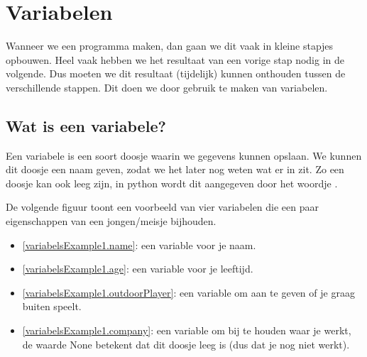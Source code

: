 \section{Variabelen}

Wanneer we een programma maken, dan gaan we dit vaak in kleine stapjes opbouwen.
Heel vaak hebben we het resultaat van een vorige stap nodig in de volgende.
Dus moeten we dit resultaat (tijdelijk) kunnen onthouden tussen de verschillende stappen.
Dit doen we door gebruik te maken van variabelen.

\subsection{Wat is een variabele?}

Een variabele is een soort doosje waarin we gegevens kunnen opslaan.
We kunnen dit doosje een naam geven, zodat we het later nog weten wat er in zit.
Zo een doosje kan ook leeg zijn, in python wordt dit aangegeven door het woordje .
\par
De volgende figuur toont een voorbeeld van vier variabelen die een paar eigenschappen van een jongen/meisje bijhouden.
\begin{itemize}
	\item
		\ref{variabelsExample1.name}: een variable  voor je naam.
	\item
		\ref{variabelsExample1.age}: een variable  voor je leeftijd.
	\item
		\ref{variabelsExample1.outdoorPlayer}: een variable  om aan te geven of je graag buiten speelt.
	\item
		\ref{variabelsExample1.company}: een variable  om bij te houden waar je werkt,
		de waarde None betekent dat dit doosje leeg is (dus dat je nog niet werkt).
\end{itemize}

